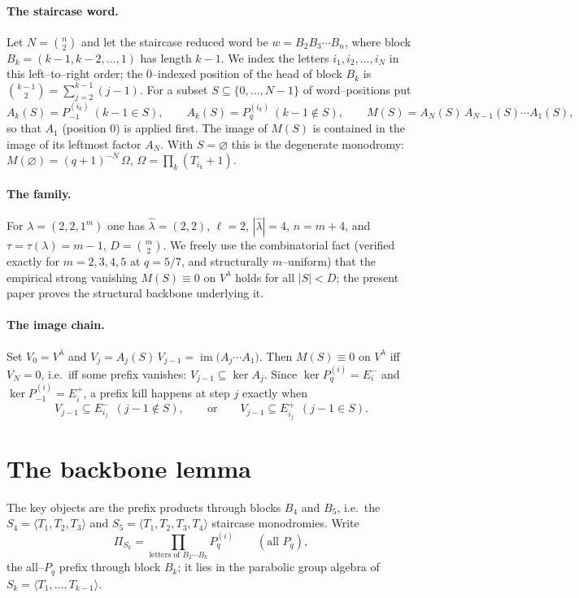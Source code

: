 \documentclass[11pt]{article}
\theoremstyle{definition}
\DeclareMathOperator{\im}{im}
\newcommand{\Pq}{P_{q}}
\newcommand{\Pm}{P_{-1}}
\newcommand{\la}{\lambda}
\newcommand{\Vl}{V^{\la}}
\newcommand{\Ep}[1]{E^{+}_{#1}}
\newcommand{\Em}[1]{E^{-}_{#1}}
\begin{document}
\paragraph{The staircase word.} Let $N=\binom n2$ and let the staircase reduced word be
$w=B_2B_3\cdots B_n$, where block $B_k=(k-1,k-2,\dots,1)$ has length $k-1$. We index the
letters $i_1,i_2,\dots,i_N$ in this left--to--right order; the $0$--indexed position of the
head of block $B_k$ is $\binom{k-1}{2}=\sum_{j=2}^{k-1}(j-1)$. For a subset
$S\subseteq\{0,\dots,N-1\}$ of word--positions put
\[
A_k(S)=\Pm^{(i_k)}\ (k\!-\!1\in S),\qquad A_k(S)=\Pq^{(i_k)}\ (k\!-\!1\notin S),
\qquad
M(S)=A_N(S)\,A_{N-1}(S)\cdots A_1(S),
\]
so that $A_1$ (position $0$) is applied first. The image of $M(S)$ is contained in the
image of its leftmost factor $A_N$. With $S=\varnothing$ this is the degenerate monodromy:
$M(\varnothing)=(q+1)^{-N}\,\Omega$, $\Omega=\prod_k(T_{i_k}+1)$.

\paragraph{The family.} For $\la=(2,2,1^m)$ one has $\hat\la=(2,2)$, $\ell=2$,
$|\hat\la|=4$, $n=m+4$, and $\tau=\tau(\la)=m-1$, $D=\binom m2$. We freely use the
combinatorial fact (verified exactly for $m=2,3,4,5$ at $q=5/7$, and structurally
$m$--uniform) that the empirical strong vanishing $M(S)\equiv0$ on $\Vl$ holds for all
$|S|<D$; the present paper proves the structural backbone underlying it.

\paragraph{The image chain.} Set $V_0=\Vl$ and $V_j=A_j(S)\,V_{j-1}=\im\!\big(A_j\cdots
A_1\big)$. Then $M(S)\equiv0$ on $\Vl$ iff $V_N=0$, i.e.\ iff some prefix vanishes:
$V_{j-1}\subseteq\ker A_j$. Since $\ker\Pq^{(i)}=\Em i$ and $\ker\Pm^{(i)}=\Ep i$, a
prefix kill happens at step $j$ exactly when
\[
V_{j-1}\subseteq\Em{i_j}\ \ (j\!-\!1\notin S),\qquad\text{or}\qquad
V_{j-1}\subseteq\Ep{i_j}\ \ (j\!-\!1\in S).
\]

\section{The backbone lemma}

The key objects are the prefix products through blocks $B_4$ and $B_5$, i.e.\ the
$S_4=\langle T_1,T_2,T_3\rangle$ and $S_5=\langle T_1,T_2,T_3,T_4\rangle$ staircase
monodromies. Write
\[
\Pi_{S_k}=\prod_{\text{letters of }B_2\cdots B_k}\Pq^{(i)}\qquad(\text{all }\Pq),
\]
the all--$\Pq$ prefix through block $B_k$; it lies in the parabolic group algebra of
$S_k=\langle T_1,\dots,T_{k-1}\rangle$.
\end{document}
